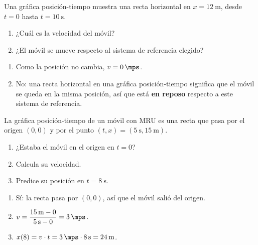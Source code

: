 \begin{exercise}
    Una gráfica posición-tiempo muestra una recta horizontal en \(x = \qty{12}{\m}\), desde \(t=0\) hasta \(t=\qty{10}{\s}\).
    \begin{enumerate}[label=\letraminuscula]
        \item ¿Cuál es la velocidad del móvil?
        \item ¿El móvil se mueve respecto al sistema de referencia elegido?
    \end{enumerate}
    \begin{solu}
        \begin{enumerate}[label=\alph*)]
            \item Como la posición no cambia, \(v = \qty{0}{\mps}\).
            \item No: una recta horizontal en una gráfica posición-tiempo significa que el móvil se queda en la misma posición, así que está \textbf{en reposo} respecto a este sistema de referencia.
        \end{enumerate}
    \end{solu}
\end{exercise}

\begin{exercise}
    La gráfica posición-tiempo de un móvil con MRU es una recta que pasa por el origen \((0,0)\) y por el punto \((t,x) = (\qty{5}{\s}, \qty{15}{\m})\).
    \begin{enumerate}[label=\letraminuscula]
        \item ¿Estaba el móvil en el origen en \(t=0\)?
        \item Calcula su velocidad.
        \item Predice su posición en \(t=\qty{8}{\s}\).
    \end{enumerate}
    \begin{solu}
        \begin{enumerate}[label=\alph*)]
            \item Sí: la recta pasa por \((0,0)\), así que el móvil salió del origen.
            \item \(v = \dfrac{\qty{15}{\m} - 0}{\qty{5}{\s} - 0} = \qty{3}{\mps}\).
            \item \(x(8) = v \cdot t = \qty{3}{\mps} \cdot \qty{8}{\s} = \qty{24}{\m}\).
        \end{enumerate}
    \end{solu}
\end{exercise}

